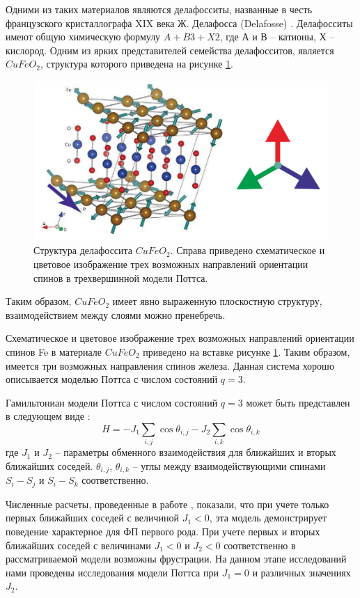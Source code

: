 Одними из таких материалов являются делафосситы, названные в честь французского кристаллографа XIX века Ж. Делафосса  (Delafosse) \cite{ph3_2, ph3_3}. Делафосситы имеют общую химическую формулу $A+B3+X2$, где $А$ и $В$ -- катионы, $Х$ -- кислород. Одним из ярких представителей семейства делафосситов, является $CuFeO_2$, структура которого приведена на рисунке \ref{phys3-pic-1}.

\begin{figure}[H]
	\centering
	\includegraphics[width=0.5\linewidth]{content/sections/images/phys3-1}
	\caption{Структура делафоссита $CuFeO_2$. Справа приведено схематическое и цветовое изображение трех возможных направлений ориентации спинов в трехвершинной  модели Поттса.}
	\label{phys3-pic-1}
\end{figure}





Таким образом, $CuFeO_2$ имеет явно выраженную плоскостную структуру, взаимодействием между слоями можно пренебречь.

Схематическое и цветовое изображение трех возможных направлений ориентации спинов  Fe  в материале $CuFeO_2$  приведено на вставке рисунке \ref{phys3-pic-1}. Таким образом, имеется три возможных направления спинов железа. Данная система хорошо описывается моделью Поттса с числом состояний $q = 3$.

Гамильтониан модели Поттса с числом состояний $q = 3$ может быть представлен в следующем виде \cite{ph3_4}:
\begin{equation}
	H = -J_1 \sum_{i,j}\cos\theta_{i,j}-J_2\sum_{i,k}\cos\theta_{i, k}
\end{equation}
где $J_1$ и $J_2$ -- параметры обменного взаимодействия для ближайших и вторых ближайших соседей. $\theta_{i,j}$, $\theta_{i,k}$ -- углы между взаимодействующими спинами $S_i - S_j$ и $S_i - S_k$ соответственно.

Численные расчеты, проведенные в работе \cite{ph3_4}, показали, что при учете только первых ближайших соседей с величиной $J_1<0$, эта модель демонстрирует поведение характерное для ФП первого рода. При учете первых и вторых ближайших соседей с величинами $J_1<0$ и $J_2<0$ соответственно в рассматриваемой модели возможны фрустрации. На данном этапе исследований нами проведены исследования модели Поттса при $J_1 = 0$ и различных значениях $J_2$.




